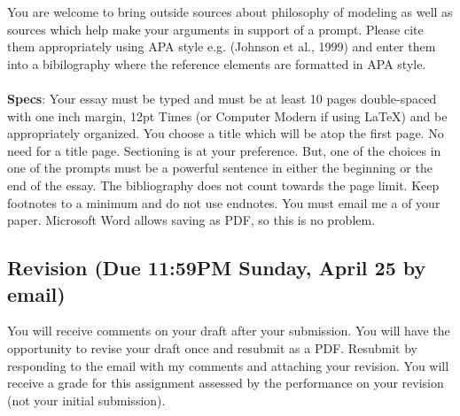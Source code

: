 \documentclass[12pt]{article}
\begin{document}
You are welcome to bring outside sources about philosophy of modeling as well as sources which help make your arguments in support of a prompt. Please cite them appropriately using APA style e.g. (Johnson et al., 1999) and enter them into a bibilography where the reference elements are formatted in APA style.\\
~\\
\textbf{Specs}: Your essay must be typed and must be at least 10 pages double-spaced with one inch margin, 12pt Times (or Computer Modern if using \LaTeX) and be appropriately organized. You choose a title which will be atop the first page. No need for a title page. Sectioning is at your preference. But, one of the choices in one of the prompts must be a powerful sentence in either the beginning or the end of the essay. The bibliography does not count towards the page limit. Keep footnotes to a minimum and do not use endnotes. You must email me a   of your paper. Microsoft Word allows saving as PDF, so this is no problem.

\subsection*{Revision (Due 11:59PM Sunday, April 25 by email)}

You will receive comments on your draft after your submission. You will have the opportunity to revise your draft once and resubmit as a PDF. Resubmit by responding to the email with my comments and attaching your revision. You will receive a grade for this assignment assessed by the performance on your revision (not your initial submission).

\end{document}
